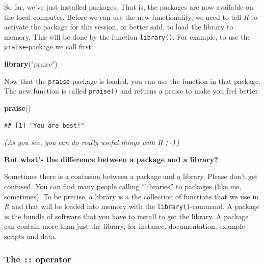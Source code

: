 \documentclass[
]{scrartcl}
\newenvironment{Shaded}{\begin{snugshade}}{\end{snugshade}}
\newcommand{\FunctionTok}[1]{\textcolor[rgb]{0.13,0.29,0.53}{\textbf{#1}}}
\newcommand{\NormalTok}[1]{#1}
\newcommand{\StringTok}[1]{\textcolor[rgb]{0.31,0.60,0.02}{#1}}
\begin{document}
So far, we've just installed packages. That is, the packages are now available on the local computer. Before we can use the new functionality, we need to tell \emph{R} to activate the package for this session, or better said, to load the library to memory. This will be done by the function \texttt{library()}. For example, to use the \texttt{praise}-package we call first:

\begin{Shaded}
\begin{Highlighting}[]
\FunctionTok{library}\NormalTok{(}\StringTok{"praise"}\NormalTok{)}
\end{Highlighting}
\end{Shaded}

Now that the \texttt{praise} package is loaded, you can use the function in that package. The new function is called \texttt{praise()} and returns a praise to make you feel better.

\begin{Shaded}
\begin{Highlighting}[]
\FunctionTok{praise}\NormalTok{()}
\end{Highlighting}
\end{Shaded}

\begin{verbatim}
## [1] "You are best!"
\end{verbatim}

\emph{(As you see, you can do really useful things with \emph{R} \texttt{;-)})}

\textbf{But what's the difference between a package and a library?}

Sometimes there is a confusion between a package and a library. Please don't get confused. You can find many people calling ``libraries'' to packages (like me, sometimes). To be precise, a library is a the collection of functions that we use in \emph{R} and that will be loaded into memory with the \texttt{library()}-command. A package is the bundle of software that you have to install to get the library. A package can contain more than just the library, for instance, documentation, example scripts and data.

\subsubsection*{\texorpdfstring{The \texttt{::} operator}{The :: operator}}\label{the-operator}
\end{document}
